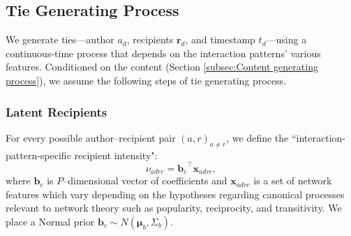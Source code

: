 \documentclass{article}
\begin{document}
\subsection{Tie Generating Process}\label{subsec:Tie generating process}
We generate ties---author $a_d$, recipients $\boldsymbol{r}_d$, and timestamp $t_d$---using a continuous-time process
that depends on the interaction patterns' various features. Conditioned on the content (Section \ref{subsec:Content generating process}), we assume the following steps of tie generating process.

\subsubsection{Latent Recipients}\label{subsubsec:Hypothetical Recipients}
For every possible author--recipient pair $(a,r)_{a \neq r}$, we define the ``interaction-pattern-specific recipient intensity":
\begin{equation}
\nu_{adrc} = {\boldsymbol{b}_c}^{\top}\boldsymbol{x}_{adrc},
\end{equation}
where $\boldsymbol{b}_c$ is $P$--dimensional vector of coefficients and $\boldsymbol{x}_{adrc}$ is a set of network features which vary depending on the hypotheses regarding canonical processes relevant to network theory such as popularity, reciprocity, and transitivity. We place a Normal prior $\boldsymbol{b}_c \sim N(\boldsymbol{\mu}_b, \Sigma_b)$.
\end{document}
